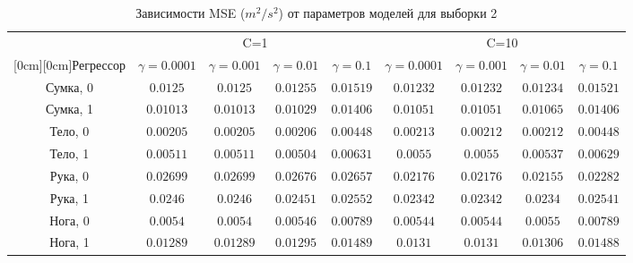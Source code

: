 \documentclass{article}
\begin{document}
{\begin{minipage}{1.5\linewidth}
\begin{table}[H]
\caption{Зависимости MSE ($m^2/s^2$) от параметров моделей для выборки 2}
\begin{center}
\begin{tabular}{|c|c|c|c|c|c|c|c|c|}
\hline
& \multicolumn{4}{c|}{C=1} & \multicolumn{4}{c|}{C=10} \\
\cline{2-9}
\raisebox{1.5ex}[0cm][0cm]{Регрессор}
& $\gamma=0.0001$ & $\gamma=0.001$ & $\gamma=0.01$ & $\gamma=0.1$
& $\gamma=0.0001$ & $\gamma=0.001$ & $\gamma=0.01$ & $\gamma=0.1$ \\
\hline
Сумка, 0
& $0.0125$
& $0.0125$
& $0.01255$
& $0.01519$
& $0.01232$
& $0.01232$
& $0.01234$
& $0.01521$\\
\hline
Сумка, 1
& $0.01013$
& $0.01013$
& $0.01029$
& $0.01406$
& $0.01051$
& $0.01051$
& $0.01065$
& $0.01406$ \\
\hline
Тело, 0
& $0.00205$
& $0.00205$
& $0.00206$
& $0.00448$
& $0.00213$
& $0.00212$
& $0.00212$
& $0.00448$ \\
\hline
Тело, 1
& $0.00511$
& $0.00511$
& $0.00504$
& $0.00631$
& $0.0055$
& $0.0055$
& $0.00537$
& $0.00629$ \\
\hline
Рука, 0
& $0.02699$
& $0.02699$
& $0.02676$
& $0.02657$
& $0.02176$
& $0.02176$
& $0.02155$
& $0.02282$ \\
\hline
Рука, 1
& $0.0246$
& $0.0246$
& $0.02451$
& $0.02552$
& $0.02342$
& $0.02342$
& $0.0234$
& $0.02541$ \\
\hline
Нога, 0
& $0.0054$
& $0.0054$
& $0.00546$
& $0.00789$
& $0.00544$
& $0.00544$
& $0.0055$
& $0.00789$ \\
\hline
Нога, 1
& $0.01289$
& $0.01289$
& $0.01295$
& $0.01489$
& $0.0131$
& $0.0131$
& $0.01306$
& $0.01488$ \\
\hline

\end{tabular}
\end{center}
\end{table} 
\end{minipage}
} 
\end{document}
